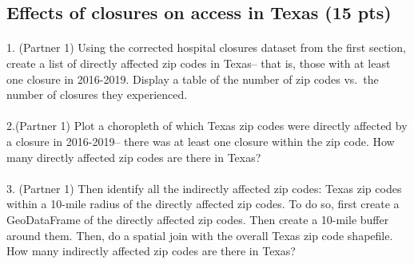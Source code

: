 \documentclass[
  letterpaper,
  DIV=11,
  numbers=noendperiod]{scrartcl}
\makeatletter
\let\oldparagraph\paragraph
\renewcommand{\paragraph}{
    \@ifstar
      \xxxParagraphStar
      \xxxParagraphNoStar
  }
\newcommand{\xxxParagraphStar}[1]{\oldparagraph*{#1}\mbox{}}
\newcommand{\xxxParagraphNoStar}[1]{\oldparagraph{#1}\mbox{}}
\makeatother
\begin{document}
\subsection{Effects of closures on access in Texas (15
pts)}\label{effects-of-closures-on-access-in-texas-15-pts}

\paragraph{1. (Partner 1) Using the corrected hospital closures dataset
from the first section, create a list of directly affected zip codes in
Texas-- that is, those with at least one closure in 2016-2019. Display a
table of the number of zip codes vs.~the number of closures they
experienced.}\label{partner-1-using-the-corrected-hospital-closures-dataset-from-the-first-section-create-a-list-of-directly-affected-zip-codes-in-texas-that-is-those-with-at-least-one-closure-in-2016-2019.-display-a-table-of-the-number-of-zip-codes-vs.-the-number-of-closures-they-experienced.}

\paragraph{2.(Partner 1) Plot a choropleth of which Texas zip codes were
directly affected by a closure in 2016-2019-- there was at least one
closure within the zip code. How many directly affected zip codes are
there in
Texas?}\label{partner-1-plot-a-choropleth-of-which-texas-zip-codes-were-directly-affected-by-a-closure-in-2016-2019-there-was-at-least-one-closure-within-the-zip-code.-how-many-directly-affected-zip-codes-are-there-in-texas}

\paragraph{3. (Partner 1) Then identify all the indirectly affected zip
codes: Texas zip codes within a 10-mile radius of the directly affected
zip codes. To do so, first create a GeoDataFrame of the directly
affected zip codes. Then create a 10-mile buffer around them. Then, do a
spatial join with the overall Texas zip code shapefile. How many
indirectly affected zip codes are there in
Texas?}\label{partner-1-then-identify-all-the-indirectly-affected-zip-codes-texas-zip-codes-within-a-10-mile-radius-of-the-directly-affected-zip-codes.-to-do-so-first-create-a-geodataframe-of-the-directly-affected-zip-codes.-then-create-a-10-mile-buffer-around-them.-then-do-a-spatial-join-with-the-overall-texas-zip-code-shapefile.-how-many-indirectly-affected-zip-codes-are-there-in-texas}
\end{document}
